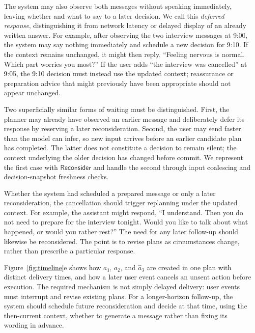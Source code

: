 \documentclass[manuscript,nonacm]{acmart}
\begin{document}
The system may also observe both messages without speaking immediately, leaving
whether and what to say to a later decision. We call this \emph{deferred response},
distinguishing it from network latency or delayed display of an already written
answer. For
example, after observing the two interview messages at 9:00, the system may say
nothing immediately and schedule a new decision for 9:10. If the context remains
unchanged, it might then reply, ``Feeling nervous is normal. Which part worries
you most?'' If the user adds ``the interview was cancelled'' at 9:05, the 9:10
decision must instead use the updated context; reassurance or preparation advice
that might previously have been appropriate should not appear unchanged.

Two superficially similar forms of waiting must be distinguished. First, the
planner may already have observed an earlier message and deliberately defer its
response by reserving a later reconsideration. Second, the user may send faster
than the model can infer, so new input arrives before an earlier candidate plan
has completed. The latter does not constitute a decision to remain silent; the
context underlying the older decision has changed before commit. We represent
the first case with $\mathsf{Reconsider}$ and handle the second through input
coalescing and decision-snapshot freshness checks.

Whether the system had scheduled a prepared message or only a later
reconsideration, the cancellation should trigger replanning under the updated
context. For example, the assistant might respond, ``I understand. Then you do
not need to prepare for the interview tonight. Would you like to talk about what
happened, or would you rather rest?'' The need for any later follow-up should
likewise be reconsidered. The point is to revise plans as circumstances change,
rather than prescribe a particular response.

Figure~\ref{fig:timeline}e shows how $a_1$, $a_2$, and $\widehat{a}_3$ are
created in one plan with distinct delivery times, and how a later user event
cancels an unsent action before execution. The required mechanism is not simply
delayed delivery: user events must interrupt and revise existing plans. For a
longer-horizon follow-up, the system should schedule future reconsideration and
decide at that time, using the then-current context, whether to generate a
message rather than fixing its wording in advance.
\end{document}

